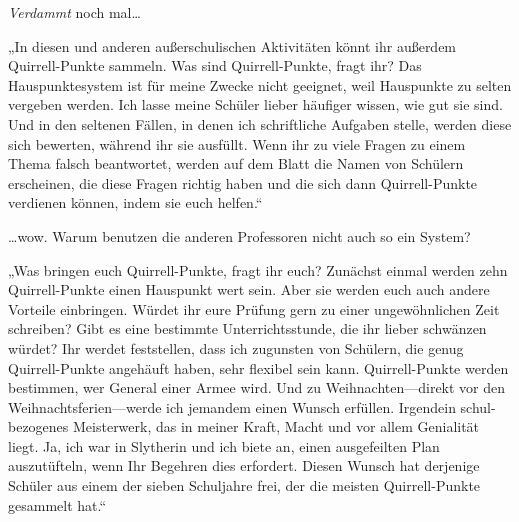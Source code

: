 \emph{Verdammt} noch mal…

„In diesen und anderen außerschulischen Aktivitäten könnt ihr außerdem Quirrell-Punkte sammeln. Was sind Quirrell-Punkte, fragt ihr? Das Hauspunktesystem ist für meine Zwecke nicht geeignet, weil Hauspunkte zu selten vergeben werden. Ich lasse meine Schüler lieber häufiger wissen, wie gut sie sind. Und in den seltenen Fällen, in denen ich schriftliche Aufgaben stelle, werden diese sich bewerten, während ihr sie ausfüllt. Wenn ihr zu viele Fragen zu einem Thema falsch beantwortet, werden auf dem Blatt die Namen von Schülern erscheinen, die diese Fragen richtig haben und die sich dann Quirrell-Punkte verdienen können, indem sie euch helfen.“

…wow. Warum benutzen die anderen Professoren nicht auch so ein System?

„Was bringen euch Quirrell-Punkte, fragt ihr euch? Zunächst einmal werden zehn Quirrell-Punkte einen Hauspunkt wert sein. Aber sie werden euch auch andere Vorteile einbringen. Würdet ihr eure Prüfung gern zu einer ungewöhnlichen Zeit schreiben? Gibt es eine bestimmte Unterrichtsstunde, die ihr lieber schwänzen würdet? Ihr werdet feststellen, dass ich zugunsten von Schülern, die genug Quirrell-Punkte angehäuft haben, sehr flexibel sein kann. Quirrell-Punkte werden bestimmen, wer General einer Armee wird. Und zu Weihnachten—direkt vor den Weihnachtsferien—werde ich jemandem einen Wunsch erfüllen. Irgendein schul-bezogenes Meisterwerk, das in meiner Kraft, Macht und vor allem Genialität liegt. Ja, ich war in Slytherin und ich biete an, einen ausgefeilten Plan auszutüfteln, wenn Ihr Begehren dies erfordert. Diesen Wunsch hat derjenige Schüler aus einem der sieben Schuljahre frei, der die meisten Quirrell-Punkte gesammelt hat.“

